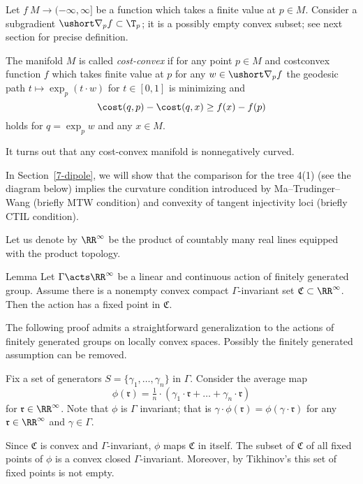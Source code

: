 Let $f\:M\to (-\infty,\infty]$ be a function which takes a finite value at $p\in M$.
Consider a subgradient $\ushort\nabla_pf\subset \T_p$; it is a possibly empty convex subset; see next section for precise definition.

The manifold $M$ is called \emph{cost-convex} if for any point $p\in M$ and costconvex function $f$ which takes finite value at $p$ for any $w\in\ushort\nabla_pf$ the geodesic path $t\mapsto \exp_p(t\cdot w)$ for $t\in [0,1]$ is minimizing
and 
\[\cost(q,p)-\cost(q,x)\ge f(x)-f(p)\]
holds for $q=\exp_pw$ and any $x\in M$.

It turns out that any cost-convex manifold is nonnegatively curved.

In Section~\ref{7-dipole}, we will show that the comparison for the tree 4(1) (see the diagram below) implies
the curvature condition introduced by Ma--Trudinger--Wang (briefly MTW condition) and convexity of tangent injectivity loci (briefly CTIL condition).














Let us denote by $\RR^\infty$ be the product of countably many real lines equipped with the product topology.

\begin{thm}{Lemma}\label{lem:tikhonov}
Let $\Gamma\acts \RR^\infty$ be a linear and continuous action of finitely generated group.
Assume there is a nonempty convex compact $\Gamma$-invariant set $\mathfrak{C}\subset \RR^\infty$.
Then the action has a fixed point in $\mathfrak{C}$.
\end{thm}

The following proof admits a straightforward generalization to the actions of finitely generated groups on locally convex spaces.
Possibly the finitely generated assumption can be removed.

Fix a set of generators $S=\{\gamma_1,\dots,\gamma_n\}$ in $\Gamma$.
Consider the average map
\[\phi(\mathfrak{r})=\tfrac1{n}\cdot(\gamma_1\cdot \mathfrak{r}+\dots+\gamma_n\cdot \mathfrak{r})\]
for $\mathfrak{r}\in\RR^\infty$.
Note that $\phi$ is $\Gamma$ invariant;
that is $\gamma\cdot \phi(\mathfrak{r})=\phi(\gamma\cdot\mathfrak{r})$ for any $\mathfrak{r}\in\RR^\infty$ and $\gamma\in \Gamma$.

Since $\mathfrak{C}$ is convex and $\Gamma$-invariant, $\phi$ maps $\mathfrak{C}$ in itself.
The subset of $\mathfrak{C}$ of all fixed points of $\phi$ is a convex closed $\Gamma$-invariant.
Moreover, by Tikhinov's this set of fixed points is not empty.

